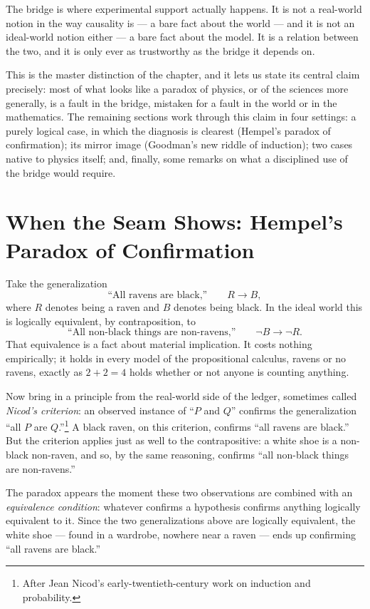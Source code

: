 \documentclass[11pt]{book}
\begin{document}
The bridge is where experimental support actually happens. It is not a real-world notion in the way causality is --- a bare fact about the world --- and it is not an ideal-world notion either --- a bare fact about the model. It is a relation between the two, and it is only ever as trustworthy as the bridge it depends on.

This is the master distinction of the chapter, and it lets us state its central claim precisely: most of what looks like a paradox of physics, or of the sciences more generally, is a fault in the bridge, mistaken for a fault in the world or in the mathematics. The remaining sections work through this claim in four settings: a purely logical case, in which the diagnosis is clearest (Hempel's paradox of confirmation); its mirror image (Goodman's new riddle of induction); two cases native to physics itself; and, finally, some remarks on what a disciplined use of the bridge would require.

\section{When the Seam Shows: Hempel's Paradox of Confirmation}

Take the generalization
\[
\text{``All ravens are black,''} \qquad R \to B,
\]
where $R$ denotes being a raven and $B$ denotes being black. In the ideal world this is logically equivalent, by contraposition, to
\[
\text{``All non-black things are non-ravens,''} \qquad \neg B \to \neg R.
\]
That equivalence is a fact about material implication. It costs nothing empirically; it holds in every model of the propositional calculus, ravens or no ravens, exactly as $2+2=4$ holds whether or not anyone is counting anything.

Now bring in a principle from the real-world side of the ledger, sometimes called \emph{Nicod's criterion}: an observed instance of ``$P$ and $Q$'' confirms the generalization ``all $P$ are $Q$.''\footnote{After Jean Nicod's early-twentieth-century work on induction and probability.} A black raven, on this criterion, confirms ``all ravens are black.'' But the criterion applies just as well to the contrapositive: a white shoe is a non-black non-raven, and so, by the same reasoning, confirms ``all non-black things are non-ravens.''

The paradox appears the moment these two observations are combined with an \emph{equivalence condition}: whatever confirms a hypothesis confirms anything logically equivalent to it. Since the two generalizations above are logically equivalent, the white shoe --- found in a wardrobe, nowhere near a raven --- ends up confirming ``all ravens are black.''
\end{document}
